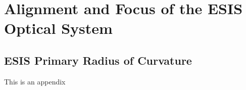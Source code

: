 \chapter{Alignment and Focus of the ESIS Optical System}

\section{ESIS Primary Radius of Curvature}

This is an appendix
